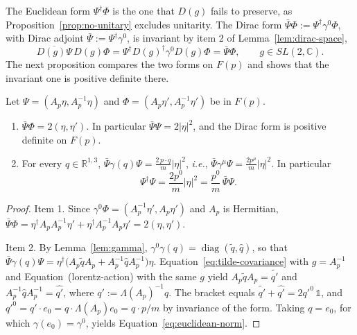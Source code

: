 The Euclidean form $\Psi^\dagger\Phi$ is the one that $D(g)$ fails to preserve, as Proposition~\ref{prop:no-unitary} excludes unitarity. The Dirac form $\bar{\Psi}\Phi:=\Psi^\dagger\gamma^0\Phi$, with Dirac adjoint $\bar{\Psi}:=\Psi^\dagger\gamma^0$, is invariant by item 2 of Lemma~\ref{lem:dirac-space},
\begin{equation}\label{eq:dirac-form-invariance}
	\overline{D(g)\Psi}\,D(g)\Phi=\Psi^\dagger D(g)^\dagger\gamma^0D(g)\Phi=\bar{\Psi}\Phi,\qquad g\in SL(2,\mathbb{C}).
\end{equation}
The next proposition compares the two forms on $F(p)$ and shows that the invariant one is positive definite there.

\begin{proposition}\label{prop:norms}
	Let $\Psi=(A_p\eta,A_p^{-1}\eta)$ and $\Phi=(A_p\eta',A_p^{-1}\eta')$ be in $F(p)$.
	\begin{enumerate}
		\item $\bar{\Psi}\Phi=2(\eta,\eta')$. In particular $\bar{\Psi}\Psi=2|\eta|^2$, and the Dirac form is positive definite on $F(p)$.
		\item For every $q\in\mathbb{R}^{1,3}$, $\bar{\Psi}\gamma(q)\Psi=\frac{2\,p\cdot q}{m}|\eta|^2$, \textit{i.e.}, $\bar{\Psi}\gamma^\mu\Psi=\frac{2p^\mu}{m}|\eta|^2$. In particular
		\begin{equation}\label{eq:euclidean-norm}
			\Psi^\dagger\Psi=\frac{2p^0}{m}|\eta|^2=\frac{p^0}{m}\,\bar{\Psi}\Psi.
		\end{equation}
	\end{enumerate}
\end{proposition}

\begin{proof}
	Item 1. Since $\gamma^0\Phi=(A_p^{-1}\eta',A_p\eta')$ and $A_p$ is Hermitian, $\bar{\Psi}\Phi=\eta^\dagger A_pA_p^{-1}\eta'+\eta^\dagger A_p^{-1}A_p\eta'=2(\eta,\eta')$.
	
	Item 2. By Lemma~\ref{lem:gamma}, $\gamma^0\gamma(q)=\operatorname{diag}(\tilde{q},\hat{q})$, so that $\bar{\Psi}\gamma(q)\Psi=\eta^\dagger\big(A_p\tilde{q}A_p+A_p^{-1}\hat{q}A_p^{-1}\big)\eta$. Equation~\eqref{eq:tilde-covariance} with $g=A_p^{-1}$ and Equation~(lorentz-action) with the same $g$ yield $A_p\tilde{q}A_p=\widetilde{q'}$ and $A_p^{-1}\hat{q}A_p^{-1}=\widehat{q'}$, where $q':=\Lambda(A_p)^{-1}q$. The bracket equals $\widetilde{q'}+\widehat{q'}=2q'^0\,\mathbb{1}$, and $q'^0=q'\cdot e_0=q\cdot\Lambda(A_p)e_0=q\cdot p/m$ by invariance of the form. Taking $q=e_0$, for which $\gamma(e_0)=\gamma^0$, yields Equation~\eqref{eq:euclidean-norm}.
\end{proof}

